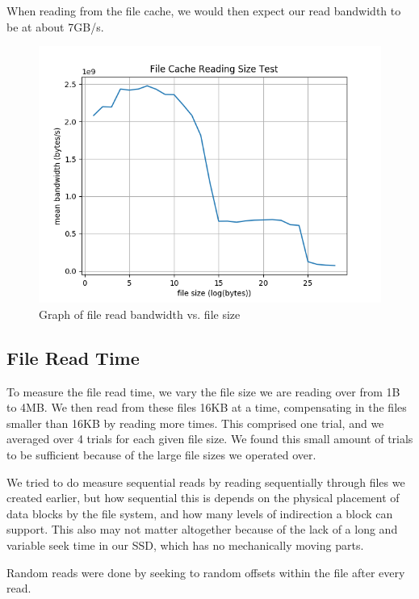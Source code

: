 \documentclass[letterpaper,twocolumn,10pt]{article}
\begin{document}
When reading from the file cache, we would then expect our read bandwidth to be
at about 7GB/s.

\begin{figure}
	\centering
	\includegraphics{graphs/file_cache}
  \caption{Graph of file read bandwidth vs. file size}
	\label{fig:filecache}
\end{figure}

\subsection{File Read Time}
To measure the file read time, we vary the file size we are reading over from
1B to 4MB. We then read from these files 16KB at a time, compensating in the
files smaller than 16KB by reading more times. This comprised one trial, and we
averaged over 4 trials for each given file size. We found this small amount of
trials to be sufficient because of the large file sizes we operated over.

We tried to do measure sequential reads by reading sequentially through files
we created earlier, but how sequential this is depends on the physical
placement of data blocks by the file system, and how many levels of indirection
a block can support. This also may not matter altogether because of the lack of
a long and variable seek time in our SSD, which has no mechanically moving
parts.

Random reads were done by seeking to random offsets within the file after every
read. 
\end{document}
